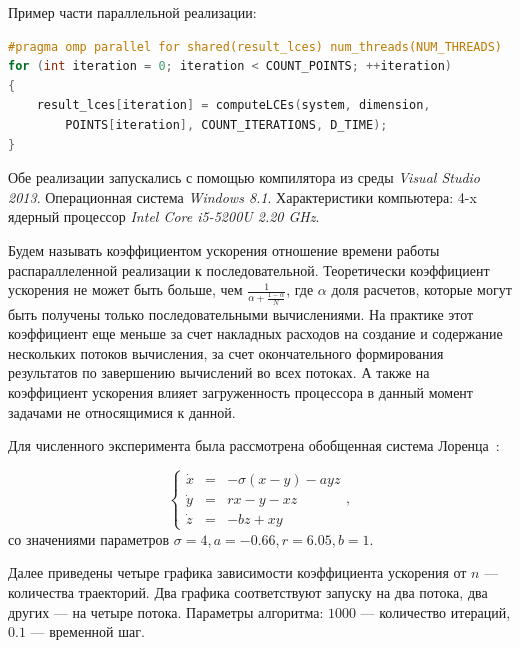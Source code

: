 \documentclass{spisok-article}
\begin{document}
Пример части параллельной реализации:

\begin{lstlisting}[language=C]
#pragma omp parallel for shared(result_lces) num_threads(NUM_THREADS)
for (int iteration = 0; iteration < COUNT_POINTS; ++iteration)
{
    result_lces[iteration] = computeLCEs(system, dimension,
        POINTS[iteration], COUNT_ITERATIONS, D_TIME);
}
\end{lstlisting}

Обе реализации запускались с помощью компилятора из среды \emph{Visual Studio 2013}. Операционная система \emph{Windows 8.1}. Характеристики компьютера: 4-x ядерный
процессор \emph{Intel Core i5-5200U 2.20 GHz}.

Будем называть коэффициентом ускорения отношение времени работы распараллеленной
реализации к последовательной. Теоретически коэффициент ускорения не может быть больше, чем
$\frac{1}{\alpha+\frac{1-\alpha}{N}}$, где $\alpha$ доля расчетов, которые могут
быть получены только последовательными вычислениями. На практике этот коэффициент
еще меньше за счет накладных расходов на создание и содержание нескольких потоков
вычисления, за счет окончательного формирования результатов по завершению
вычислений во всех потоках. А также на коэффициент ускорения влияет загруженность
процессора в данный момент задачами не относящимися к данной.

Для численного эксперимента была рассмотрена обобщенная система Лоренца~\cite{art:rabinovich_main, art:lyap_meth_for_hausd_dim, art:CNSNS_2014, art:EPJST_2015}:

\begin{equation} \label{eq:lorenz}
\left\{
\begin{array}{rcl}
  \dot x & = & -\sigma (x-y)-ayz \\
  \dot y & = & rx-y-xz \\
  \dot z & = & -bz+xy
\end{array}
\right.,
\end{equation}
со значениями параметров $\sigma = 4, a = -0.66, r = 6.05, b = 1$.

Далее приведены четыре графика зависимости коэффициента ускорения 
от $n$ --- количества траекторий. Два графика соответствуют запуску на два потока, два других --- на четыре потока. Параметры алгоритма: $1000$ --- количество итераций, $0.1$ --- временной шаг.
\end{document}
